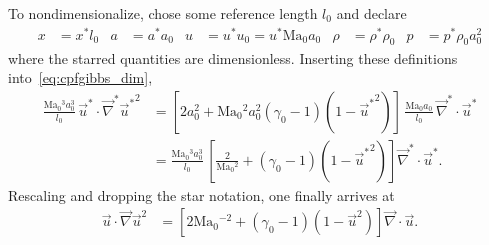 \documentclass[letterpaper,11pt,nointlimits,reqno]{amsart}
\newcommand{\Mach}[1][]{\mbox{Ma}_{#1}}
\begin{document}
To nondimensionalize, chose some reference length $l_0$ and declare
\begin{align}
    x     &= x^\ast l_0
&   a     &= a^\ast a_0
&   u     &= u^\ast u_0 = u^\ast \Mach[0] a_0
&   \rho  &= \rho^\ast \rho_0
&   p     &= p^\ast \rho_0 a_0^2
\label{eq:nondimensionalization}
\end{align}
where the starred quantities are dimensionless.  Inserting these definitions
into~\eqref{eq:cpfgibbs_dim},
\begin{align}
       \frac{\Mach[0]{}^3 a_0^3}{l_0}
       \,
       \vec{u}^\ast \cdot \vec{\nabla}^\ast{\vec{u}^\ast}^2
    &=
       \left[
          2 a_0^2
        + \Mach[0]{}^2 a_0^2 \left(\gamma_0-1\right) \left(1 - {\vec{u}^\ast}^2\right)
       \right]
       \,
       \frac{\Mach[0]{} a_0}{l_0}
       \,
       \vec{\nabla}^\ast\cdot\vec{u}^\ast
\\
    &=
       \frac{\Mach[0]{}^3 a_0^3}{l_0}
       \,
       \left[
          \frac{2}{\Mach[0]{}^2}
        + \left(\gamma_0-1\right) \left(1 - {\vec{u}^\ast}^2\right)
       \right]
       \vec{\nabla}^\ast\cdot\vec{u}^\ast
.
\end{align}
Rescaling and dropping the star notation, one finally arrives at
\begin{align}
       \vec{u} \cdot \vec{\nabla}\vec{u}^2
    &=
       \left[
          2 \Mach[0]{}^{-2}
        + \left(\gamma_0-1\right) \left(1 - \vec{u}^2\right)
       \right]
       \vec{\nabla}\cdot\vec{u}
\label{eq:cpfgibbs_nondim}
.
\end{align}
\end{document}
